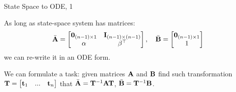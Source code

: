 \documentclass{beamer}
\begin{document}
\begin{frame}{State Space to ODE, 1}
	\begin{flushleft}
		
		As long as state-space system has matrices:
		\begin{align}
			\bar{\mathbf{A}} = 
			\begin{bmatrix}
				\mathbf{0}_{(n-1) \times 1} & \mathbf{I}_{(n-1) \times (n-1)} \\
				\alpha & \beta^\top
			\end{bmatrix},
			\ \ \
			\bar{\mathbf{B}} = 
			\begin{bmatrix}
				\mathbf{0}_{(n-1) \times 1} \\
				1
			\end{bmatrix}
		\end{align}
		we can re-write it in an ODE form. 
		
		\bigskip
		
		We can formulate a task: given matrices $\mathbf{A}$ and $\mathbf{B}$ find such transformation $\mathbf{T} = 
		\begin{bmatrix}
			\mathbf{t}_1 & ... & \mathbf{t}_n
		\end{bmatrix}$ 
		that $\bar{\mathbf{A}} = \mathbf{T}^{-1}\mathbf{A}\mathbf{T}$, $\bar{\mathbf{B}} = \mathbf{T}^{-1}\mathbf{B}$.
		
		
	\end{flushleft}
\end{frame}
\end{document}
